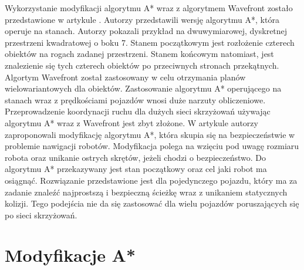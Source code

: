 \newline
\indent
Wykorzystanie modyfikacji algorytmu A* wraz z algorytmem Wavefront zostało przedstawione w artykule \cite{wojnicki2015robust}. Autorzy przedstawili wersję algorytmu A*, która operuje na stanach. Autorzy pokazali przykład na dwuwymiarowej, dyskretnej przestrzeni kwadratowej o boku 7. Stanem początkowym jest rozłożenie czterech obiektów na rogach zadanej przestrzeni. Stanem końcowym natomiast, jest znalezienie się tych czterech obiektów po przeciwnych stronach przekątnych. Algortym Wavefront został zastosowany w celu otrzymania planów wielowariantowych dla obiektów. Zastosowanie algorytmu A* operującego na stanach wraz z prędkościami pojazdów wnosi duże narzuty obliczeniowe. Przeprowadzenie koordynacji ruchu dla dużych sieci skrzyżowań używając algorytmu A* wraz z Wavefront jest zbyt złożone.
\newline
\indent
W artykule \cite{elhalawany2013modified} autorzy zaproponowali modyfikację algorytmu A*, która skupia się na bezpieczeństwie w problemie nawigacji robotów. Modyfikacja polega na wzięciu pod uwagę rozmiaru robota oraz unikanie ostrych skrętów, jeżeli chodzi o bezpieczeństwo. Do algorytmu A* przekazywany jest stan początkowy oraz cel jaki robot ma osiągnąć. Rozwiązanie przedstawione jest dla pojedynczego pojazdu, który ma za zadanie znaleźć najprostszą i bezpieczną ścieżkę wraz z unikaniem statycznych kolizji. Tego podejścia nie da się zastosować dla wielu pojazdów poruszających się po sieci skrzyżowań.

\section{Modyfikacje A*}

